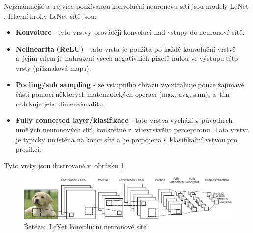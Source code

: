 Nejznámnější a~nejvíce používanou konvoluční neuronovu sítí jsou modely LeNet \cite{lenet}.
Hlavní kroky LeNet sítě jsou:
\begin{itemize}
  \item{\textbf{Konvoluce} - tyto vrstvy provádějí konvoluci nad vstupy do neuronové sítě.}
  \item{\textbf{Nelinearita (ReLU)} - tato vrsta je použita po každé konvoluční vrstvě a~jejim cílem je nahrazení všech negativních pixelů nulou ve výstupu této vrsty (příznaková mapa).}
  \item{\textbf{Pooling/sub sampling} - ze vstupního obrazu vyextrahuje pouze zajímavé části pomocí některých matematických operací (max, avg, sum), a~tím redukuje jeho dimenzionalitu.}
  \item{\textbf{Fully connected layer/klasifikace} - tato vrstva vychází z~původních umělých neuronových sítí, konkrétně z~vícevrstvého perceptronu. Tato vrstva je typicky umístěna na konci sítě a~je propojena s~klasifikační vstvou pro predikci.}
\end{itemize}

Tyto vrsty jsou ilustrované v~obrázku \ref{fig:cnn}.
\begin{figure}[H]
\centering
\includegraphics[width=1.1\linewidth]{figures/cnn.pdf}
\caption{Řetězec LeNet konvoluční neuronové sítě \cite{lenet}}
\label{fig:cnn}
\end{figure}
